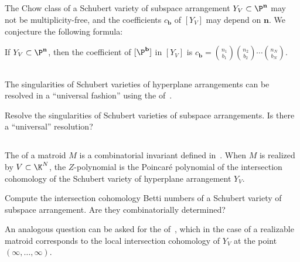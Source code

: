 \subsection{}
The Chow class of a Schubert variety of subspace arrangement $Y_V \subset \P^{\mathbf n}$ may not be multiplicity-free, and the coefficients $c_{\mathbf b}$ of $[Y_V]$ may depend on $\mathbf n$.
We conjecture the following formula:
\begin{conj}
  If $Y_V \subset \P^{\mathbf n}$, then  the coefficient of $[\P^{\mathbf b}]$ in $[Y_V]$ is $c_{\mathbf b} = \binom{n_1}{b_1}\binom{n_2}{b_2} \cdots \binom{n_N}{b_N}$.
\end{conj}
\subsection{}
The singularities of Schubert varieties of hyperplane arrangements can be resolved in a ``universal fashion'' using the  of~\cite{BHMPW20}.
\begin{ques}
  Resolve the singularities of Schubert varieties of subspace arrangements. Is there a ``universal'' resolution?
\end{ques}

\subsection{}
The  of a matroid $M$ is a combinatorial invariant defined in~\cite{Zpoly}.
When $M$ is realized by $V \subset \K^N$, the $Z$-polynomial is the Poincar\'e polynomial of the intersection cohomology of the Schubert variety of hyperplane arrangement $Y_V$.
\begin{ques}
  Compute the intersection cohomology Betti numbers of a Schubert variety of subspace arrangement.
  Are they combinatorially determined?
\end{ques}
An analogous question can be asked for the  of~\cite{KLpoly}, which in the case of a realizable matroid corresponds to the local intersection cohomology of $Y_V$ at the point $(\infty, \ldots, \infty)$.
